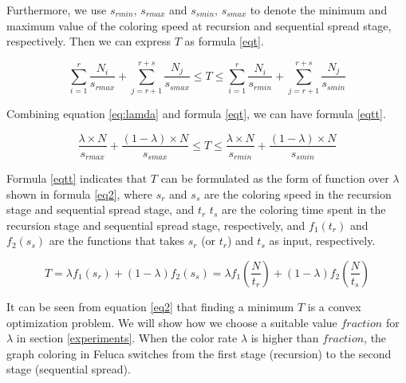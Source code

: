 Furthermore, we use $s_{rmin}$, $s_{rmax}$ and $s_{smin}$, $s_{smax}$ to denote the minimum and maximum value of the coloring speed at recursion and sequential spread stage, respectively. Then we can express $T$ as formula \ref{eqt}.

\begin{equation}
\label{eqt}
		\sum_{i=1}^{r}\frac{N_i}{s_{rmax}}+\sum_{j=r+1}^{r+s}\frac{N_j}{s_{smax}} \leq T \leq \sum_{i=1}^{r}\frac{N_i}{s_{rmin}}+\sum_{j=r+1}^{r+s}\frac{N_j}{s_{smin}}
\end{equation}


Combining equation \ref{eq:lamda} and  formula \ref{eqt}, we can have formula \ref{eqtt}.

\begin{equation}
\label{eqtt}
		\frac{\lambda \times N}{s_{rmax}}+\frac{(1-\lambda) \times N}{s_{smax}} \leq T \leq \frac{\lambda \times N}{s_{rmin}}+\frac{(1-\lambda) \times N}{s_{smin}}
\end{equation}

Formula \ref{eqtt} indicates that $T$ can be formulated as the form of function over $\lambda$ shown in formula \ref{eq2}, where $s_r$ and $s_s$ are the coloring speed in the recursion stage and sequential spread stage, and $t_r$ $t_s$ are the coloring time spent in the recursion stage and sequential spread stage, respectively, and $f_1(t_r)$ and $f_2(s_s)$ are the functions that takes $s_r$ (or $t_r$) and $t_s$ as input, respectively. 

\begin{equation}
\label{eq2}
		T= \lambda f_1(s_r) + (1-\lambda)f_2(s_s) = \lambda f_1(\frac{N}{t_r}) + (1-\lambda)f_2(\frac{N}{t_s})
\end{equation}

It can be seen from equation \ref{eq2} that finding a minimum $T$ is a convex optimization problem. We will show how we choose a suitable value $fraction$ for $\lambda$ in section \ref{experiments}. When the color rate $\lambda$ is higher than $fraction$, the graph coloring in Feluca switches from the first stage (recursion) to the second stage (sequential spread). 